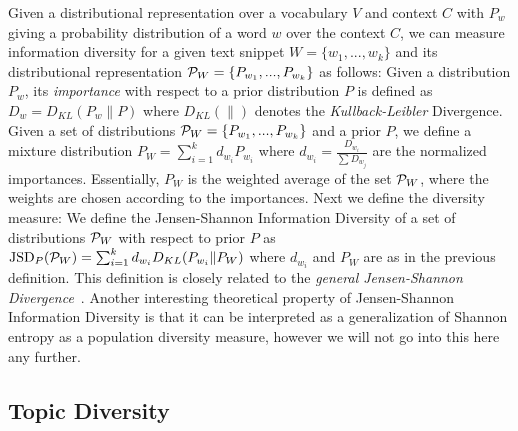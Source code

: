 \documentclass{article} %
\begin{document}
Given a distributional representation over a vocabulary $V$ and context $C$ with $P_w$ giving a probability distribution of a
word $w$ over the context $C$, we can measure information diversity for a given text snippet $W=\{w_1,...,w_k\}$ and its
distributional representation ${\mathcal P}_{W}=\{P_{w_1},...,P_{w_k}\}$ as follows:
\bed\label{importance}
Given a distribution $P_w$, its {\sl importance} with respect to a
prior distribution $P$ is defined as $D_w = D_{KL}(P_w\|P)$ where $D_{KL}(\|)$ denotes the
{\sl Kullback-Leibler} Divergence.
\eed
\bed\label{mixture}
Given a set of distributions ${\mathcal P}_{W}=\{P_{w_1},...,P_{w_k}\}$ and a
prior $P$, we
define a mixture distribution $P_W=\sum_{i=1}^k d_{w_i} P_{w_i}$ where $d_{w_i}=\frac{D_{w_i}}{\sum D_{w_j}}$ are the normalized
importances.
\eed
Essentially, $P_W$ is the weighted average of the set ${\mathcal P}_{W}$, where
the weights are chosen according to the importances. Next we
define the diversity measure:
\bed\label{diversity}
We define the Jensen-Shannon Information Diversity of a set of
distributions ${\mathcal P}_W$ with respect to 
prior $P$ as $\mbox{JSD}_P({\mathcal P}_W)=\sum_{i=1}^k d_{w_i}D_{KL}(P_{w_i}\|P_W)$
where $d_{w_i}$ and $P_W$ are as in the previous definition.
\eed
This definition is closely related to the 
{\em general Jensen-Shannon Divergence}~\cite{FugledeTopsoe}. Another
interesting theoretical property of Jensen-Shannon Information
Diversity is that it can be interpreted as a generalization of Shannon
entropy as a population diversity measure, however we will not go
into this here any further. 


\subsection{Topic Diversity}
\label{sec:topic-diversity}
\end{document}
